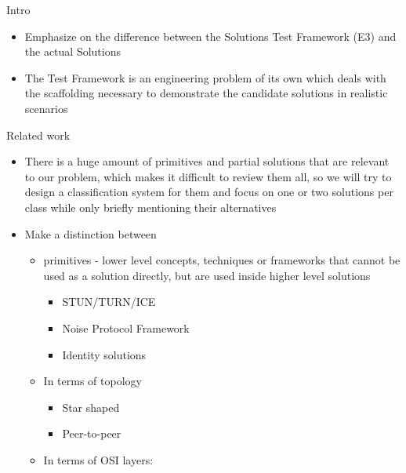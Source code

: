 \begin{frame}
\makeatletter
\def\fps@figure{h}
\makeatother
\end{frame}

\begin{frame}{Intro}
\protect\hypertarget{intro}{}
\begin{itemize}
\tightlist
\item
  Emphasize on the difference between the Solutions Test Framework (E3)
  and the actual Solutions
\item
  The Test Framework is an engineering problem of its own which deals
  with the scaffolding necessary to demonstrate the candidate solutions
  in realistic scenarios
\end{itemize}
\end{frame}

\begin{frame}[fragile]{Related work}
\protect\hypertarget{related-work}{}
\begin{itemize}
\item
  There is a huge amount of primitives and partial solutions that are
  relevant to our problem, which makes it difficult to review them all,
  so we will try to design a classification system for them and focus on
  one or two solutions per class while only briefly mentioning their
  alternatives
\item
  Make a distinction between

  \begin{itemize}
  \tightlist
  \item
    primitives - lower level concepts, techniques or frameworks that
    cannot be used as a solution directly, but are used inside higher
    level solutions

    \begin{itemize}
    \tightlist
    \item
      STUN/TURN/ICE
    \item
      Noise Protocol Framework
    \item
      Identity solutions
    \end{itemize}
  \item
    In terms of topology

    \begin{itemize}
    \tightlist
    \item
      Star shaped
    \item
      Peer-to-peer
    \end{itemize}
  \item
    In terms of OSI layers:


\end{itemize}
\end{itemize}
\end{frame}
